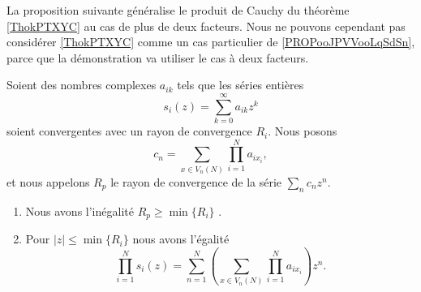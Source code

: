 La proposition suivante généralise le produit de Cauchy du théorème \ref{ThokPTXYC} au cas de plus de deux facteurs. Nous ne pouvons cependant pas considérer \ref{ThokPTXYC} comme un cas particulier de \ref{PROPooJPVVooLqSdSn}, parce que la démonstration va utiliser le cas à deux facteurs.
\begin{proposition}     \label{PROPooJPVVooLqSdSn}
	Soient des nombres complexes \( a_{ik}\) tels que les séries entières
	\begin{equation}
		s_i(z)=\sum_{k=0}^{\infty}a_{ik}z^k
	\end{equation}
	soient convergentes avec un rayon de convergence \( R_i\). Nous posons
	\begin{equation}
		c_n=\sum_{x\in V_n(N)}\prod_{i=1}^Na_{ix_i},
	\end{equation}
	et nous appelons \( R_p\) le rayon de convergence de la série \( \sum_nc_nz^n\).
	\begin{enumerate}
		\item
		      Nous avons l'inégalité \( R_p\geq \min\{R_i\}\) .
		\item       \label{ITEMooUVNXooLxlawx}
		      Pour \( | z |\leq \min\{R_i\}\) nous avons l'égalité
		      \begin{equation}        \label{EQooHCUGooDRhxzt}
			      \prod_{i=1}^Ns_i(z)=\sum_{n=1}^N\left( \sum_{x\in V_n(N)}\prod_{i=1}^Na_{ix_i} \right)z^n.
		      \end{equation}
	\end{enumerate}
\end{proposition}

